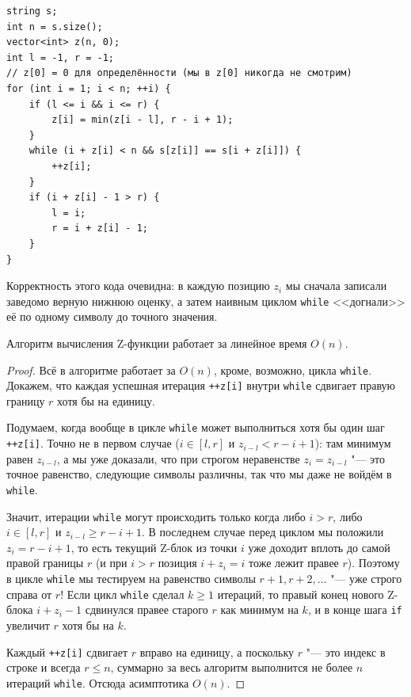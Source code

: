 \begin{lstlisting}
string s;
int n = s.size();
vector<int> z(n, 0);
int l = -1, r = -1;
// z[0] = 0 для определённости (мы в z[0] никогда не смотрим)
for (int i = 1; i < n; ++i) {
    if (l <= i && i <= r) {
        z[i] = min(z[i - l], r - i + 1);
    }
    while (i + z[i] < n && s[z[i]] == s[i + z[i]]) {
        ++z[i];
    }
    if (i + z[i] - 1 > r) {
        l = i;
        r = i + z[i] - 1;
    }
}
\end{lstlisting}

Корректность этого кода очевидна: в каждую позицию $z_i$ мы сначала записали заведомо верную нижнюю оценку, а затем наивным циклом \texttt{while} <<догнали>> её по одному символу до точного значения.

\begin{theorem}
    Алгоритм вычисления Z-функции работает за линейное время $O(n)$.
\end{theorem}

\begin{proof}
    Всё в алгоритме работает за $O(n)$, кроме, возможно, цикла \texttt{while}. Докажем, что каждая успешная итерация \texttt{++z[i]} внутри \texttt{while} сдвигает правую границу $r$ хотя бы на единицу.

    Подумаем, когда вообще в цикле \texttt{while} может выполниться хотя бы один шаг \texttt{++z[i]}. Точно не в первом случае ($i \in [l, r]$ и $z_{i-l} < r - i + 1$): там минимум равен $z_{i-l}$, а мы уже доказали, что при строгом неравенстве $z_i = z_{i-l}$ "--- это точное равенство, следующие символы различны, так что мы даже не войдём в \texttt{while}.

    Значит, итерации \texttt{while} могут происходить только когда либо $i > r$, либо $i \in [l, r]$ и $z_{i-l} \ge r - i + 1$. В последнем случае перед циклом мы положили $z_i = r - i + 1$, то есть текущий Z-блок из точки $i$ уже доходит вплоть до самой правой границы $r$ (и при $i > r$ позиция $i + z_i = i$ тоже лежит правее $r$). Поэтому в цикле \texttt{while} мы тестируем на равенство символы $r + 1, r + 2, \dots$ "--- уже строго справа от $r$! Если цикл \texttt{while} сделал $k \ge 1$ итераций, то правый конец нового Z-блока $i + z_i - 1$ сдвинулся правее старого $r$ как минимум на $k$, и в конце шага \texttt{if} увеличит $r$ хотя бы на $k$.

    Каждый \texttt{++z[i]} сдвигает $r$ вправо на единицу, а поскольку $r$ "--- это индекс в строке и всегда $r \le n$, суммарно за весь алгоритм выполнится не более $n$ итераций \texttt{while}. Отсюда асимптотика $O(n)$.
\end{proof}

